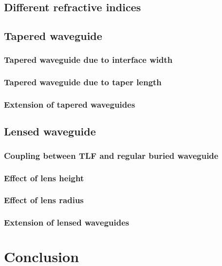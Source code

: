 \section{Different refractive indices}


\section{Tapered waveguide}


\subsection{Tapered waveguide due to interface width} 


\subsection{Tapered waveguide due to taper length}


\subsection{Extension of tapered waveguides}
\label{sect:optim_tapered_ext}


\section{Lensed waveguide}


\subsection{Coupling between TLF and regular buried waveguide}
\label{sect:optim_lensed_regular}


\subsection{Effect of lens height}
\label{sect:optim_lensed_height}

%
\subsection{Effect of lens radius}


\subsection{Extension of lensed waveguides}
\label{sect:optim_lensed_ext}

%
\chapter{Conclusion}










%



